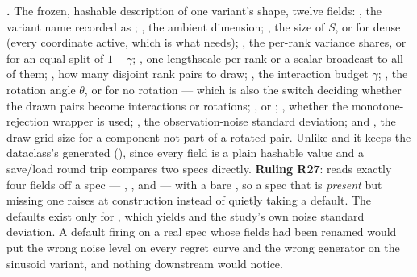 \textbf{.} The frozen, hashable description of one variant's
shape, twelve fields: , the variant name recorded as
; , the ambient dimension; ,
the size of $S$, or  for dense (every coordinate active, which is
what  needs); , the per-rank variance shares,
or  for an equal split of $1-\gamma$; , one
lengthscale per rank or a scalar broadcast to all of them; ,
how many disjoint rank pairs to draw; , the interaction budget
$\gamma$; , the rotation angle $\theta$, or  for
no rotation --- which is also the switch deciding whether the drawn pairs
become interactions or rotations; ,  or
; , whether the monotone-rejection wrapper is
used; , the observation-noise standard deviation; and
, the draw-grid size for a component not part of a rotated
pair. Unlike  and  it keeps the dataclass's
generated  (), since every field is a plain
hashable value and a save/load round trip compares two specs directly.
\textbf{Ruling R27}:  reads exactly four fields off a
spec --- , ,  and
 --- with a bare , so a spec that is
\emph{present} but missing one raises  at construction
instead of quietly taking a default. The defaults exist only for
, which yields  and the study's own
noise standard deviation. A default firing on a real spec whose fields had been
renamed would put the wrong noise level on every regret curve and the wrong
generator on the sinusoid variant, and nothing downstream would notice.

